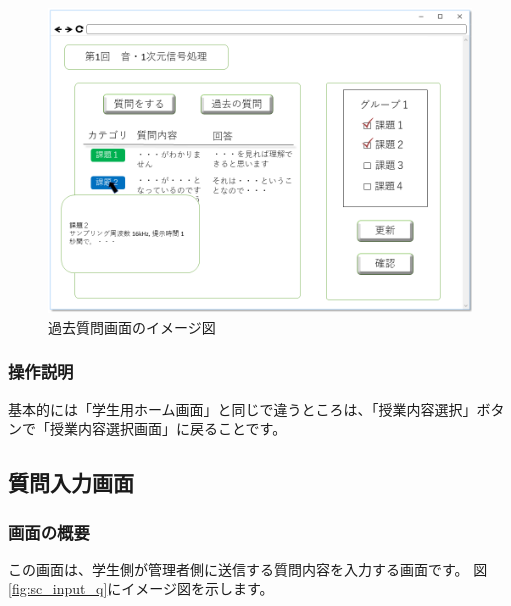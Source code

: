 \begin{figure}[htbp]
\begin{center}
  \includegraphics[width=1\linewidth,clip]{./img/sc_pre_q.png}
  \caption{過去質問画面のイメージ図}\label{fig:sc_pre_q}
\end{center}
\end{figure}

\subsubsection{操作説明}
基本的には「学生用ホーム画面」と同じで違うところは、「授業内容選択」ボタンで「授業内容選択画面」に戻ることです。

\newpage

\subsection{質問入力画面}
\subsubsection{画面の概要}
この画面は、学生側が管理者側に送信する質問内容を入力する画面です。
図\ref{fig:sc_input_q}にイメージ図を示します。

